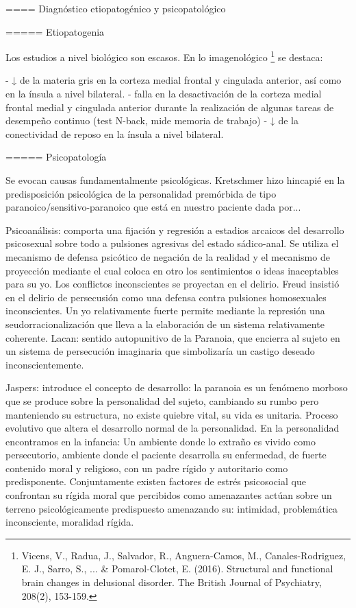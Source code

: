 ==== Diagnóstico etiopatogénico y psicopatológico

===== Etiopatogenia

Los estudios a nivel biológico son escasos. En lo imagenológico \footnote{Vicens, V., Radua, J., Salvador, R., Anguera-Camos, M., Canales-Rodriguez, E. J., Sarro, S., ... \& Pomarol-Clotet, E. (2016). Structural and functional brain changes in delusional disorder. The British Journal of Psychiatry, 208(2), 153-159.} se destaca:

- ↓ de la materia gris en la corteza medial frontal y cingulada anterior, así como en la ínsula a nivel bilateral.
- falla en la desactivación de la corteza medial frontal medial y cingulada anterior durante la realización de algunas tareas de desempeño continuo (test N-back, mide memoria de trabajo)
- ↓ de la conectividad de reposo en la ínsula a nivel bilateral.

===== Psicopatología

Se evocan causas fundamentalmente psicológicas. Kretschmer hizo hincapié en la predisposición psicológica de la personalidad premórbida de tipo paranoico/sensitivo-paranoico que está en nuestro paciente dada por... 

Psicoanálisis: comporta una fijación y regresión a estadios arcaicos del desarrollo psicosexual sobre todo a pulsiones agresivas del estado sádico-anal. Se utiliza el mecanismo de defensa psicótico de negación de la realidad y el mecanismo de proyección mediante el cual coloca en otro los sentimientos o ideas inaceptables para su yo. Los conflictos inconscientes se proyectan en el delirio. Freud insistió en el delirio de persecusión como una defensa contra pulsiones homosexuales inconscientes. Un yo relativamente fuerte permite mediante la represión una seudorracionalización que lleva a la elaboración de un sistema relativamente coherente. Lacan: sentido autopunitivo de la Paranoia, que encierra al sujeto en un sistema de persecución imaginaria que simbolizaría un castigo deseado inconscientemente. 

Jaspers: introduce el concepto de desarrollo: la paranoia es un fenómeno morboso que se produce sobre la personalidad del sujeto, cambiando su rumbo pero manteniendo su estructura, no existe quiebre vital, su vida es unitaria. Proceso evolutivo que altera el desarrollo normal de la personalidad. En la personalidad encontramos en la infancia: Un ambiente donde lo extraño es vivido como persecutorio, ambiente donde el paciente desarrolla su enfermedad, de fuerte contenido moral y religioso, con un padre rígido y autoritario como predisponente. Conjuntamente existen factores de estrés psicosocial que confrontan su rígida moral que percibidos como amenazantes actúan sobre un terreno psicológicamente predispuesto amenazando su: intimidad, problemática inconsciente, moralidad rígida.


